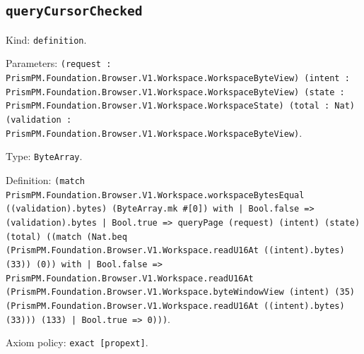 \documentclass[11pt]{article}
\begin{document}
\subsection*{\texttt{queryCursorChecked}}
\noindent Kind: \texttt{definition}.\par
\noindent Parameters: \texttt{(request : PrismPM.Foundation.Browser.V1.Workspace.WorkspaceByteView) (intent : PrismPM.Foundation.Browser.V1.Workspace.WorkspaceByteView) (state : PrismPM.Foundation.Browser.V1.Workspace.WorkspaceState) (total : Nat) (validation : PrismPM.Foundation.Browser.V1.Workspace.WorkspaceByteView)}.\par
\noindent Type: \texttt{ByteArray}.\par
\noindent Definition: \texttt{(match PrismPM.Foundation.Browser.V1.Workspace.workspaceBytesEqual ((validation).bytes) (ByteArray.mk \#[0]) with | Bool.false => (validation).bytes | Bool.true => queryPage (request) (intent) (state) (total) ((match (Nat.beq (PrismPM.Foundation.Browser.V1.Workspace.readU16At ((intent).bytes) (33)) (0)) with | Bool.false => PrismPM.Foundation.Browser.V1.Workspace.readU16At (PrismPM.Foundation.Browser.V1.Workspace.byteWindowView (intent) (35) (PrismPM.Foundation.Browser.V1.Workspace.readU16At ((intent).bytes) (33))) (133) | Bool.true => 0)))}.\par
\noindent Axiom policy: \texttt{exact [propext]}.\par
\end{document}
